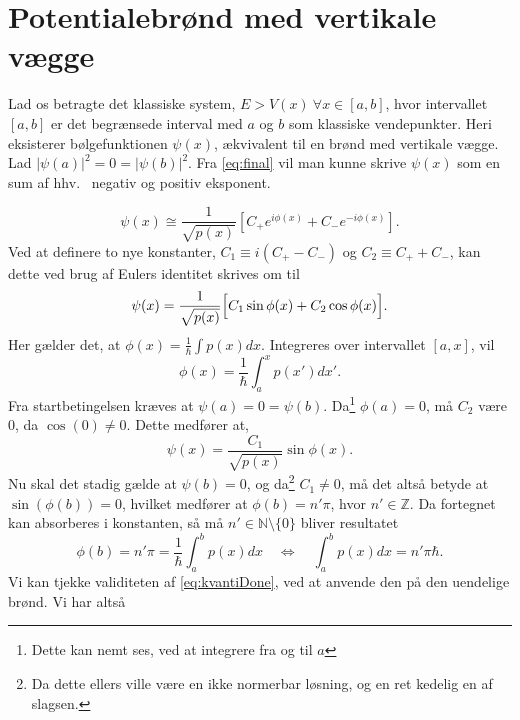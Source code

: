 \section{Potentialebrønd med vertikale vægge}
Lad os betragte det klassiske system, $E > V(x) \ \forall x \in[a,b]$, hvor intervallet $[a,b]$ er det begrænsede interval med $a$ og $b$ som klassiske vendepunkter. Heri eksisterer bølgefunktionen $\psi(x)$, ækvivalent til en brønd med vertikale vægge. Lad $|\psi(a)|^{2} = 0 = |\psi(b)|^{2}$. Fra \cref{eq:final} vil man kunne skrive $\psi(x)$ som en sum af hhv. \ negativ og positiv eksponent.

\begin{equation}
    \psi(x) \cong \frac{1}{\sqrt{p(x)}}\left[C_{+}e^{i\phi(x)}+C_{-}e^{-i\phi(x)}\right].
  \label{eq:kvantiseringStart}
\end{equation}
Ved at definere to nye konstanter, $C_1 \equiv i(C_{+}-C_{-})$ og $C_2 \equiv C_{+}+C_{-}$, kan dette ved brug af Eulers identitet skrives om til
\begin{equation}
  \psi(x) = \frac{1}{\sqrt{p(x)}}
  \Bigl[    C_1\sin{\phi(x)} + C_2\cos{\phi(x)}   \Bigr].
  \label{eq:kvantiseringSinCos}
\end{equation}
Her gælder det, at $\phi(x) = \frac{1}{\hbar}\int p(x) dx$. Integreres over intervallet $[a, x]$, vil
\begin{equation}
  \phi(x) = \frac{1}{\hbar}\int_{a}^{x} p(x')dx'.
\end{equation}
Fra startbetingelsen kræves at $\psi(a) = 0 = \psi(b)$. Da\footnote{Dette kan nemt ses, ved at integrere fra og til $a$} $\phi(a) = 0$, må $C_2$ være 0, da $\cos(0)\neq 0$. Dette medfører at,
\begin{equation}
    \psi(x) = \frac{C_1}{\sqrt{p(x)}}\sin{\phi(x)}.
\end{equation}
Nu skal det stadig gælde at $\psi(b) = 0$, og da\footnote{Da dette ellers ville være en ikke normerbar løsning, og en ret kedelig en af slagsen.} $C_1\neq 0$, må det altså betyde at $\sin(\phi(b)) = 0$, hvilket medfører at $\phi(b) = n'\pi$, hvor $n' \in \mathbb{Z}$. Da fortegnet kan absorberes i konstanten, så må $n' \in \mathbb{N} \setminus \{0\}$ bliver resultatet
\begin{equation}
    \phi(b) = n'\pi = \frac{1}{\hbar}\int_{a}^{b} p(x) dx \quad \Leftrightarrow \quad \int_{a}^{b} p(x) dx = n'\pi\hbar.
  \label{eq:kvantiDone}
\end{equation}
Vi kan tjekke validiteten af \cref{eq:kvantiDone}, ved at anvende den på den uendelige brønd. Vi har altså
